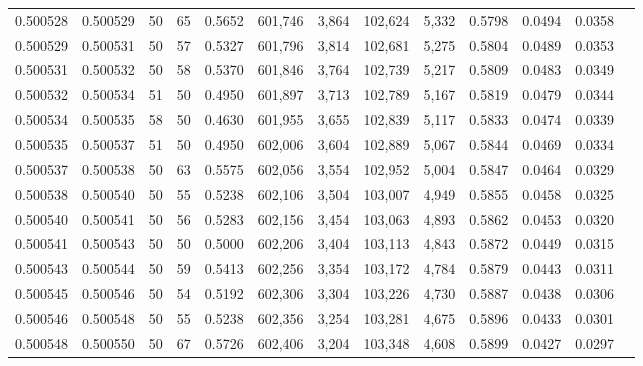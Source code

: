 \begin{tabular}{rrrrrrrrrrrrr}
0.500528 & 0.500529 &    50 &  65 &                                     0.5652 & 601,746 &   3,864 & 102,624 &   5,332 & 0.5798 & 0.0494 & 0.0358 \\
0.500529 & 0.500531 &    50 &  57 &                                     0.5327 & 601,796 &   3,814 & 102,681 &   5,275 & 0.5804 & 0.0489 & 0.0353 \\
0.500531 & 0.500532 &    50 &  58 &                                     0.5370 & 601,846 &   3,764 & 102,739 &   5,217 & 0.5809 & 0.0483 & 0.0349 \\
0.500532 & 0.500534 &    51 &  50 &                                     0.4950 & 601,897 &   3,713 & 102,789 &   5,167 & 0.5819 & 0.0479 & 0.0344 \\
0.500534 & 0.500535 &    58 &  50 &                                     0.4630 & 601,955 &   3,655 & 102,839 &   5,117 & 0.5833 & 0.0474 & 0.0339 \\
0.500535 & 0.500537 &    51 &  50 &                                     0.4950 & 602,006 &   3,604 & 102,889 &   5,067 & 0.5844 & 0.0469 & 0.0334 \\
0.500537 & 0.500538 &    50 &  63 &                                     0.5575 & 602,056 &   3,554 & 102,952 &   5,004 & 0.5847 & 0.0464 & 0.0329 \\
0.500538 & 0.500540 &    50 &  55 &                                     0.5238 & 602,106 &   3,504 & 103,007 &   4,949 & 0.5855 & 0.0458 & 0.0325 \\
0.500540 & 0.500541 &    50 &  56 &                                     0.5283 & 602,156 &   3,454 & 103,063 &   4,893 & 0.5862 & 0.0453 & 0.0320 \\
0.500541 & 0.500543 &    50 &  50 &                                     0.5000 & 602,206 &   3,404 & 103,113 &   4,843 & 0.5872 & 0.0449 & 0.0315 \\
0.500543 & 0.500544 &    50 &  59 &                                     0.5413 & 602,256 &   3,354 & 103,172 &   4,784 & 0.5879 & 0.0443 & 0.0311 \\
0.500545 & 0.500546 &    50 &  54 &                                     0.5192 & 602,306 &   3,304 & 103,226 &   4,730 & 0.5887 & 0.0438 & 0.0306 \\
0.500546 & 0.500548 &    50 &  55 &                                     0.5238 & 602,356 &   3,254 & 103,281 &   4,675 & 0.5896 & 0.0433 & 0.0301 \\
0.500548 & 0.500550 &    50 &  67 &                                     0.5726 & 602,406 &   3,204 & 103,348 &   4,608 & 0.5899 & 0.0427 & 0.0297 \\

\end{tabular}
